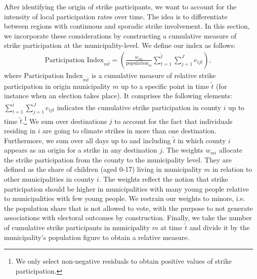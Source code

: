 After identifying the origin of strike participants, we want to account for the intensity of local participation rates over time. The idea is to differentiate between regions with continuous and sporadic strike involvement. In this section, we incorporate these considerations by constructing a cumulative measure of strike participation at the municipality-level. We define our index as follows:
\begin{align}
	\text{Participation Index}_{m\tilde{t}} = \left( \frac{w_{mi}}{\text{population}_{m}} \sum\limits_{t=1}^{\tilde{t}}\sum\limits_{j=1}^{J} e_{ijt}\right), \label{eq_greta_cons:participation_index}
\end{align}
where $\text{Participation Index}_{m\tilde{t}}$ is a cumulative measure of relative strike participation in origin municipality $m$ up to a specific point in time $\tilde{t}$ (for instance when an election takes place). It comprises the following elements: $\sum_{t=1}^{\tilde{t}}\sum_{j=1}^{J} e_{ijt}$ indicates the cumulative strike participation in county $i$ up to time $\tilde{t}$.\footnote{We only select non-negative residuals to obtain positive values of strike participation.} We sum over destinations $j$ to account for the fact that individuals residing in $i$ are going to climate strikes in more than one destination. Furthermore, we sum over all days up to and including $\tilde{t}$ in which county $i$ appears as an origin for a strike in any destination $j$. The weights $w_{mi}$ allocate the strike participation from the county to the municipality level. They are defined as the share of children (aged 0-17) living in municipality $m$ in relation to other municipalities in county $i$. The weights reflect the notion that strike participation should be higher in municipalities with many young people relative to municipalities with few young people. We restrain our weights to minors, i.e. the population share that is not allowed to vote, with the purpose to not generate associations with electoral outcomes by construction. Finally, we take the number of cumulative strike participants in municipality $m$ at time $\tilde{t}$ and divide it by the municipality's population figure to obtain a relative measure.

















